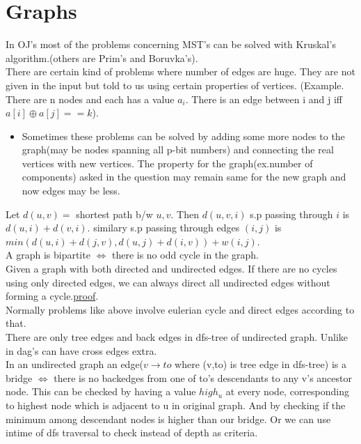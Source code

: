 \documentclass[../Notes.tex]{subfiles}
\begin{document}
\chapter{Graphs}

In OJ's most of the problems concerning MST's can be solved with Kruskal's algorithm.(others are Prim's and Boruvka's).\\ 

There are certain kind of problems where number of edges are huge. They are not given in the input but told to us using certain properties of vertices. (Example. There are n nodes and each has a value $a_{i}$. There is an edge between i and j iff $a[i]\oplus a[j]==k$).
\begin{itemize}
	\item Sometimes these problems can be solved by adding some more nodes to the graph(may be nodes spanning all p-bit numbers) and connecting the real vertices with new vertices. The property for the graph(ex.number of components) asked in the question may remain same for the new graph and now edges may be less.
\end{itemize}

Let $d(u,v) =$ shortest path b/w $u,v$. Then $d(u,v,i)$ s.p passing through $i$ is $d(u,i)+d(v,i)$. similary s.p passing through edges $(i,j)$ is $min(d(u,i)+d(j,v),d(u,j)+d(i,v))+w(i,j)$.\\

A graph is bipartite $\iff$ there is no odd cycle in the graph.\\

Given a graph with both directed and undirected edges. If there are no cycles using only directed edges, we can always direct all undirected edges without forming a cycle.\href{./Material/Making undirected edges direct.pdf}{proof}.\\
Normally problems like above involve eulerian cycle and direct edges according to that.\\

There are only tree edges and back edges in dfs-tree of undirected graph. Unlike in dag's can have cross edges extra.\\

In an undirected graph an edge($v\rightarrow to$ where (v,to) is tree edge in dfs-tree) is a bridge $\iff$ there is no backedges from one of to's descendants to any v's ancestor node. This can be checked by having a value $high_u$ at every node, corresponding to highest node which is adjacent to u in original graph. And by checking if the minimum among descendant nodes is higher than our bridge. Or we can use intime of dfs traversal to check instead of depth as criteria.
\end{document}
